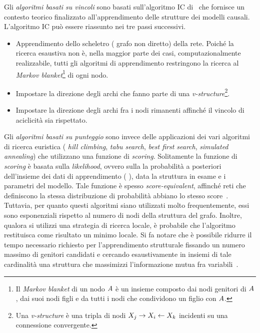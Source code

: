 Gli \emph{algoritmi basati su vincoli} sono basati sull'algoritmo \acf{IC} di~\citet{Verma1991} che fornisce un contesto teorico finalizzato all'apprendimento delle strutture dei modelli causali. L'algoritmo \acs{IC} può essere riassunto nei tre passi successivi.
\begin{itemize}
    \item Apprendimento dello scheletro (\ie{} grafo non diretto) della rete. Poiché la ricerca esaustiva non è, nella maggior parte dei casi, computazionalmente realizzabile, tutti gli algoritmi di apprendimento restringono la ricerca al \emph{Markov blanket}\footnote{\label{note:markov-blanket}Il \emph{Markov blanket} di un nodo $\mathnormal{A}$ è un insieme composto dai nodi genitori di $\mathnormal{A}$, dai suoi nodi figli e da tutti i nodi che condividono un figlio con $\mathnormal{A}$.} di ogni nodo.
    \item Impostare la direzione degli archi che fanno parte di una \emph{v-structure}\footnote{Una \emph{v-structure} è una tripla di nodi $\mathnormal{X}_j\rightarrow\mathnormal{X}_i\leftarrow\mathnormal{X}_k$ incidenti su una connessione convergente.}.
    \item Impostare la direzione degli archi fra i nodi rimanenti affinché il vincolo di aciclicità sia rispettato.
\end{itemize}

Gli \emph{algoritmi basati su punteggio} sono invece delle applicazioni dei vari algoritmi di ricerca euristica (\eg{} \emph{hill climbing}, \emph{tabu search}, \emph{best first search}, \emph{simulated annealing}) che utilizzano una funzione di \emph{scoring}. Solitamente la funzione di \emph{scoring} è basata sulla \emph{likelihood}, ovvero sulla la probabilità a posteriori dell'insieme dei dati di apprendimento (\ie{} \emph{\keyword{\trs{}}}), data la struttura in esame e i parametri del modello. Tale funzione è spesso \emph{score-equivalent}, affinché reti che definiscono la stessa distribuzione di probabilità abbiano lo stesso score~\citep{Chickering2013}. Tuttavia, per quanto questi algoritmi siano utilizzati molto frequentemente, essi sono esponenziali rispetto al numero di nodi della struttura del grafo. Inoltre, qualora si utilizzi una strategia di ricerca locale, è probabile che l'algoritmo restituisca come risultato un minimo locale. Si fa notare che è possibile ridurre il tempo necessario richiesto per l'apprendimento strutturale fissando un numero massimo di genitori candidati e cercando esaustivamente in insiemi di tale cardinalità una struttura che massimizzi l'informazione mutua fra variabili~\citep[][]{Heckerman1995}.

